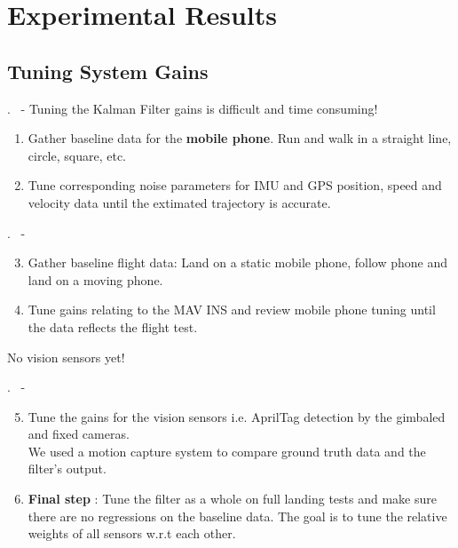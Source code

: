 \section{Experimental Results}

\subsection{Tuning System Gains}
\begin{frame}{\thesection. \insertsection \ - \insertsubsection}
	Tuning the Kalman Filter gains is difficult and time consuming!
	\begin{enumerate}
		\item Gather baseline data for the \textbf{mobile phone}. Run and walk in a straight line,
		circle, square, etc.
		\item Tune corresponding noise parameters for IMU and GPS position, speed and velocity data
		until the extimated trajectory is accurate.
	\end{enumerate}
\end{frame}


\begin{frame}{\thesection. \insertsection \ - \insertsubsection}
	\begin{enumerate}
		\setcounter{enumi}{2}
		\item Gather baseline flight data: Land on a static mobile phone, follow
		phone and land on a moving phone.
		\item Tune gains relating to the MAV INS and review mobile phone tuning until
		the data reflects the flight test.
	\end{enumerate}
	No vision sensors yet!
\end{frame}


\begin{frame}{\thesection. \insertsection \ - \insertsubsection}
	\begin{enumerate}
		\setcounter{enumi}{4}
		\item Tune the gains for the vision sensors i.e. AprilTag detection by the gimbaled and fixed cameras.\\
		We used a motion capture system to compare ground truth data and the filter's output.
		\item \textbf{Final step} : Tune the filter as a whole on full landing tests and make sure 
		there are no regressions on the baseline data. The goal is to tune the relative weights of all
		sensors w.r.t each other.
		
	\end{enumerate}
\end{frame}

